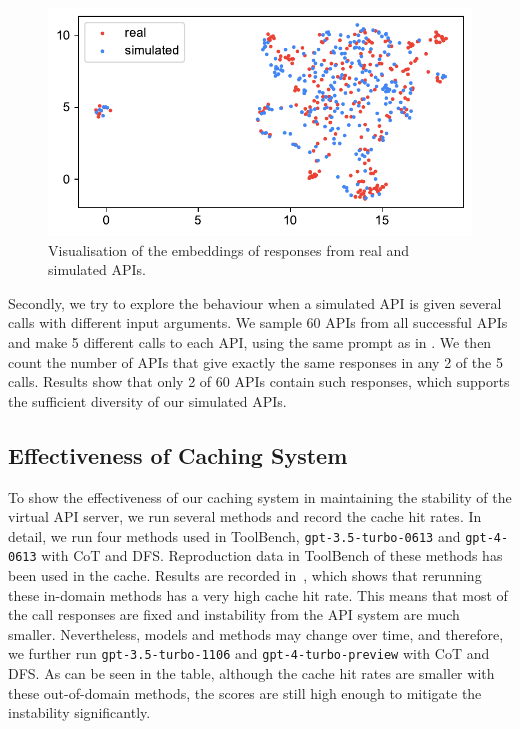 \begin{figure}[h!]
    \centering
    \includegraphics[width=\linewidth]{figs/diversity_comparison.pdf}
    \caption{Visualisation of the embeddings of responses from real and simulated APIs.}
    \label{fig:diversity_comparison}
\end{figure}

Secondly, we try to explore the behaviour when a simulated API is given several calls with different input arguments. 
We sample 60 APIs from all successful APIs and make 5 different calls to each API, using the same prompt as in .
We then count the number of APIs that give exactly the same responses in any 2 of the 5 calls. Results show that only 2 of 60 APIs contain such responses, which supports the sufficient diversity of our simulated APIs.


\subsection{Effectiveness of Caching System}
To show the effectiveness of our caching system in maintaining the stability of the virtual API server, we run several methods and record the cache hit rates. In detail, we run four methods used in ToolBench, \texttt{gpt-3.5-turbo-0613} and \texttt{gpt-4-0613} with CoT and DFS. Reproduction data in ToolBench of these methods has been used in the cache. Results are recorded in~, which shows that rerunning these in-domain methods has a very high cache hit rate. This means that most of the call responses are fixed and instability from the API system are much smaller. Nevertheless, models and methods may change over time, and therefore, we further run \texttt{gpt-3.5-turbo-1106} and \texttt{gpt-4-turbo-preview} with CoT and DFS.  As can be seen in the table, although the cache hit rates are smaller with these out-of-domain methods, the scores are still high enough to mitigate the instability significantly.



